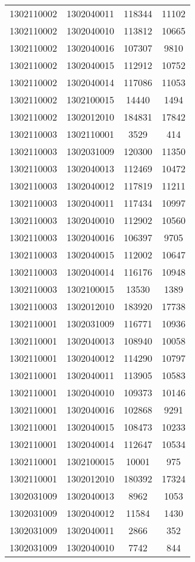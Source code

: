 \begin{longtable}{llcc}
1302110002 & 1302040011 & 118344 & 11102\\
1302110002 & 1302040010 & 113812 & 10665\\
1302110002 & 1302040016 & 107307 & 9810\\
1302110002 & 1302040015 & 112912 & 10752\\
1302110002 & 1302040014 & 117086 & 11053\\
1302110002 & 1302100015 & 14440 & 1494\\
1302110002 & 1302012010 & 184831 & 17842\\
1302110003 & 1302110001 & 3529 & 414\\
1302110003 & 1302031009 & 120300 & 11350\\
1302110003 & 1302040013 & 112469 & 10472\\
1302110003 & 1302040012 & 117819 & 11211\\
1302110003 & 1302040011 & 117434 & 10997\\
1302110003 & 1302040010 & 112902 & 10560\\
1302110003 & 1302040016 & 106397 & 9705\\
1302110003 & 1302040015 & 112002 & 10647\\
1302110003 & 1302040014 & 116176 & 10948\\
1302110003 & 1302100015 & 13530 & 1389\\
1302110003 & 1302012010 & 183920 & 17738\\
1302110001 & 1302031009 & 116771 & 10936\\
1302110001 & 1302040013 & 108940 & 10058\\
1302110001 & 1302040012 & 114290 & 10797\\
1302110001 & 1302040011 & 113905 & 10583\\
1302110001 & 1302040010 & 109373 & 10146\\
1302110001 & 1302040016 & 102868 & 9291\\
1302110001 & 1302040015 & 108473 & 10233\\
1302110001 & 1302040014 & 112647 & 10534\\
1302110001 & 1302100015 & 10001 & 975\\
1302110001 & 1302012010 & 180392 & 17324\\
1302031009 & 1302040013 & 8962 & 1053\\
1302031009 & 1302040012 & 11584 & 1430\\
1302031009 & 1302040011 & 2866 & 352\\
1302031009 & 1302040010 & 7742 & 844\\

\end{longtable}
